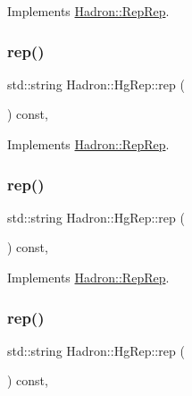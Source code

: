 Implements \mbox{\hyperlink{structHadron_1_1RepRep_ab3213025f6de249f7095892109575fde}{Hadron\+::\+Rep\+Rep}}.

\mbox{\label{structHadron_1_1HgRep_a229b19e7f1d4fa443b715de9b5ed4454}} 
\subsubsection{\texorpdfstring{rep()}{rep()}\hspace{0.1cm}{\footnotesize\ttfamily [3/5]}}
{\footnotesize\ttfamily std\+::string Hadron\+::\+Hg\+Rep\+::rep (\begin{DoxyParamCaption}{ }\end{DoxyParamCaption}) const\hspace{0.3cm}{\ttfamily [inline]}, {\ttfamily [virtual]}}



Implements \mbox{\hyperlink{structHadron_1_1RepRep_ab3213025f6de249f7095892109575fde}{Hadron\+::\+Rep\+Rep}}.

\mbox{\label{structHadron_1_1HgRep_a229b19e7f1d4fa443b715de9b5ed4454}} 
\subsubsection{\texorpdfstring{rep()}{rep()}\hspace{0.1cm}{\footnotesize\ttfamily [4/5]}}
{\footnotesize\ttfamily std\+::string Hadron\+::\+Hg\+Rep\+::rep (\begin{DoxyParamCaption}{ }\end{DoxyParamCaption}) const\hspace{0.3cm}{\ttfamily [inline]}, {\ttfamily [virtual]}}



Implements \mbox{\hyperlink{structHadron_1_1RepRep_ab3213025f6de249f7095892109575fde}{Hadron\+::\+Rep\+Rep}}.

\mbox{\label{structHadron_1_1HgRep_a229b19e7f1d4fa443b715de9b5ed4454}} 
\subsubsection{\texorpdfstring{rep()}{rep()}\hspace{0.1cm}{\footnotesize\ttfamily [5/5]}}
{\footnotesize\ttfamily std\+::string Hadron\+::\+Hg\+Rep\+::rep (\begin{DoxyParamCaption}{ }\end{DoxyParamCaption}) const\hspace{0.3cm}{\ttfamily [inline]}, {\ttfamily [virtual]}}



